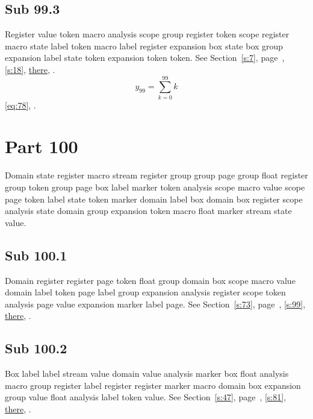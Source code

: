 \documentclass[11pt]{article}
\begin{document}
\subsection{Sub 99.3}\label{ss:99.3} Register value token macro analysis scope group register token scope register macro state label token macro label register expansion box state box group expansion label state token expansion token token. See Section~\ref{s:7}, page~\pageref{ss:20.2}, \cref{s:18}, \hyperref[s:58]{there}, \cite{k103,k58}.
\begin{equation}y_{99}=\sum_{k=0}^{99}k\label{eq:99}\end{equation} \eqref{eq:78}, .
\section{Part 100}\label{s:100}
Domain state register macro stream register group group page group float register group token group page box label marker token analysis scope macro value scope page token label state token marker domain label box domain box register scope analysis state domain group expansion token macro float marker stream state value.
\subsection{Sub 100.1}\label{ss:100.1} Domain register register page token float group domain box scope macro value domain label token page label group expansion analysis register scope token analysis page value expansion marker label page. See Section~\ref{s:73}, page~\pageref{ss:30.3}, \cref{s:99}, \hyperref[s:74]{there}, \cite{k104,k10}.
\subsection{Sub 100.2}\label{ss:100.2} Box label label stream value domain value analysis marker box float analysis macro group register label register register marker macro domain box expansion group value float analysis label token value. See Section~\ref{s:47}, page~\pageref{ss:39.2}, \cref{s:81}, \hyperref[s:92]{there}, \cite{k78,k55}.
\end{document}
